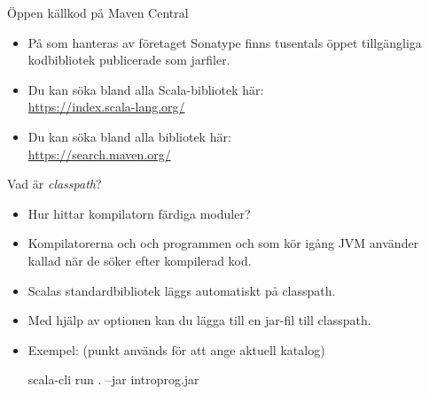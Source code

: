 \begin{Slide}{Öppen källkod på Maven Central}
\begin{itemize}
  \item På  som hanteras av företaget Sonatype finns tusentals öppet tillgängliga kodbibliotek publicerade som jarfiler.
  \item Du kan söka bland alla Scala-bibliotek här: \\\url{https://index.scala-lang.org/}
  \item Du kan söka bland alla bibliotek här: \\\url{https://search.maven.org/}
\end{itemize}
\end{Slide}


\begin{Slide}{Vad är \emph{classpath}?}\SlideFontSmall
\begin{itemize}
  \item Hur hittar kompilatorn färdiga moduler?
\pause
\item Kompilatorerna  och  och programmen  och  som kör igång JVM använder  kallad  när de söker efter kompilerad kod.
\pause
\item Scalas standardbibliotek läggs automatiskt på classpath.
\item Med hjälp av optionen  kan du lägga till en jar-fil till classpath. %
\item Exempel: (punkt används för att ange aktuell katalog)
\begin{REPLnonum}
scala-cli run . --jar introprog.jar
\end{REPLnonum}
\end{itemize}
\end{Slide}


